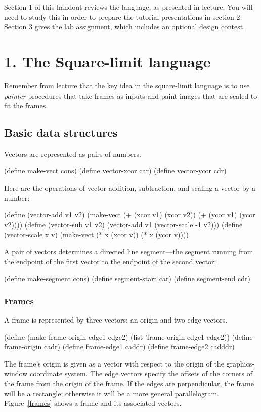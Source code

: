 Section 1 of this handout reviews the language, as presented in
lecture.  You will need to study this in order to prepare the
tutorial presentations in section 2.  Section 3 gives the lab assignment,
which includes an optional design contest.


\section{1. The Square-limit language}

Remember from lecture that the key idea in the square-limit language
is to use {\em painter} procedures that take frames as inputs and
paint images that are scaled to fit the frames.

\subsection{Basic data structures}

Vectors are represented as pairs of numbers.

\beginlisp
(define make-vect cons)
(define vector-xcor car)
(define vector-ycor cdr)
\endlisp

Here are the operations of vector addition, subtraction, and scaling a
vector by a number:

\beginlisp
(define (vector-add v1 v2)
  (make-vect (+ (xcor v1) (xcor v2))
             (+ (ycor v1) (ycor v2))))
\null
(define (vector-sub v1 v2)
  (vector-add v1 (vector-scale -1 v2)))
\null
(define (vector-scale x v)
  (make-vect (* x (xcor v))
             (* x (ycor v))))
\endlisp

A pair of vectors determines a directed line segment---the segment
running from the endpoint of the first vector to the endpoint of the
second vector:

\beginlisp
(define make-segment cons)
(define segment-start car)
(define segment-end cdr)
\endlisp

\subsubsection{Frames}

A frame is represented by three vectors: an origin and two edge
vectors.

\beginlisp
(define (make-frame origin edge1 edge2)
  (list 'frame origin edge1 edge2))
\null
(define frame-origin cadr)
(define frame-edge1 caddr)
(define frame-edge2 cadddr)
\endlisp

The frame's origin is given as a vector with respect to the origin of
the graphics-window coordinate system.  The edge vectors specify the
offsets of the corners of the frame from the origin of the frame.  If
the edges are perpendicular, the frame will be a rectangle; otherwise
it will be a more general parallelogram.  Figure~\ref{frames} shows a
frame and its associated vectors.


